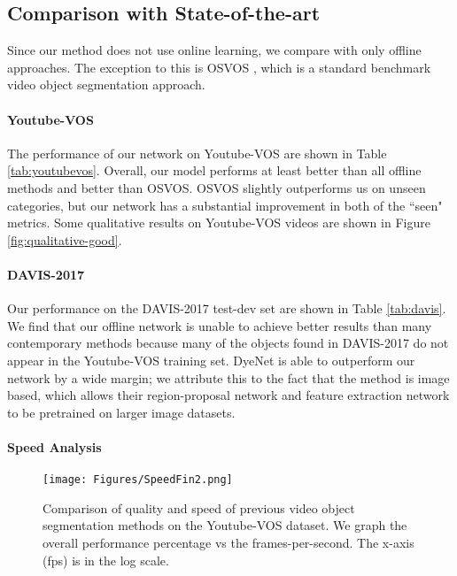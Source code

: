 \documentclass[10pt,twocolumn,letterpaper]{article}
\begin{document}
\subsection{Comparison with State-of-the-art}
Since our method does not use online learning, we compare with only offline approaches. The exception to this is OSVOS \cite{caelles2017one}, which is a standard benchmark video object segmentation approach.

\paragraph{Youtube-VOS}
The performance of our network on Youtube-VOS are shown in Table \ref{tab:youtubevos}. Overall, our model performs at least  better than all offline methods and  better than OSVOS. OSVOS slightly outperforms us on unseen categories, but our network has a substantial  improvement in both of the ``seen" metrics. Some qualitative results on Youtube-VOS videos are shown in Figure \ref{fig:qualitative-good}.

\paragraph{DAVIS-2017}
Our performance on the DAVIS-2017 test-dev set are shown in Table \ref{tab:davis}. We find that our offline network is unable to achieve better results than many contemporary methods because many of the objects found in DAVIS-2017 do not appear in the Youtube-VOS training set. DyeNet \cite{li2018video} is able to outperform our network by a wide margin; we attribute this to the fact that the method is image based, which allows their region-proposal network and feature extraction network to be pretrained on larger image datasets.


\paragraph{Speed Analysis}

\begin{figure}[ht!]
\begin{center}
\texttt{[image: Figures/SpeedFin2.png]}

\end{center}
   \caption{Comparison of quality and speed of previous video object segmentation methods on the Youtube-VOS dataset. We graph the overall performance percentage vs the frames-per-second. The x-axis (fps) is in the log scale.}
\label{fig:speed}
\end{figure}
\end{document}
